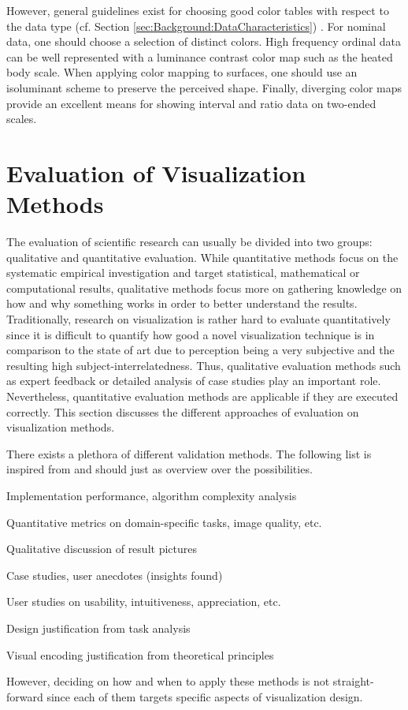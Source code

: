 However, general guidelines exist for choosing good color tables with respect to the data type (cf. Section \ref{sec:Background:DataCharacteristics}) \cite{Borland:2007:RainbowColormap, Treinish:2009:Should}.
For nominal data, one should choose a selection of distinct colors.
High frequency ordinal data can be well represented with a luminance contrast color map such as the heated body scale.
When applying color mapping to surfaces, one should use an isoluminant scheme to preserve the perceived shape.
Finally, diverging color maps \cite{Moreland:2009:DivergingCM} provide an excellent means for showing interval and ratio data on two-ended scales.


\section{Evaluation of Visualization Methods}
The evaluation of scientific research can usually be divided into two groups: qualitative and quantitative evaluation.
While quantitative methods focus on the systematic empirical investigation and target  statistical, mathematical or computational results, qualitative methods focus more on gathering knowledge on how and why something works in order to better understand the results.
Traditionally, research on visualization is rather hard to evaluate quantitatively since it is difficult to quantify how good a novel visualization technique is in comparison to the state of art due to perception being a very subjective  and the resulting high subject-interrelatedness.
Thus, qualitative evaluation methods such as expert feedback or detailed analysis of case studies play an important role.
Nevertheless, quantitative evaluation methods are applicable if they are executed correctly.
This section discusses the different approaches of evaluation on visualization methods.

There exists a plethora of different validation methods. The following list is inspired from \cite{Munzner:2008:InfoVis} and should just  as overview over the possibilities.
\begin{my_list_item}
	\item Implementation performance, algorithm complexity analysis
	\item Quantitative metrics on domain-specific tasks, image quality, etc.
	\item Qualitative discussion of result pictures
	\item Case studies, user anecdotes (insights found)
	\item User studies on usability, intuitiveness, appreciation, etc.
	\item Design justification from task analysis
	\item Visual encoding justification from theoretical principles
\end{my_list_item}
However, deciding on how and when to apply these methods is not straight-forward since each of them targets specific aspects of visualization design.

